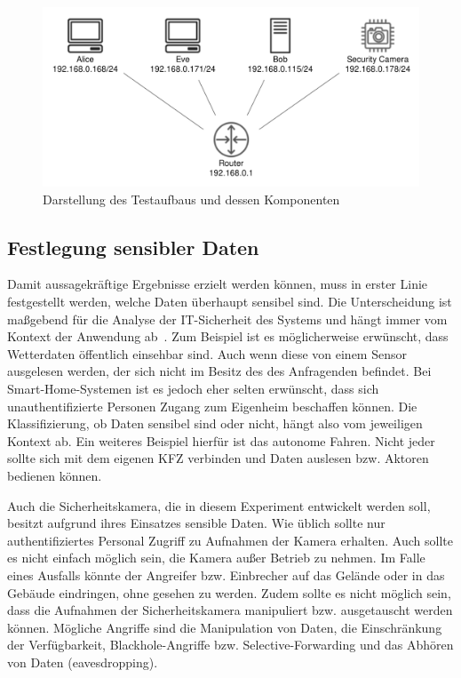 \begin{figure}[htbp]
  \centerline{\includegraphics[width=\columnwidth]{images/testing-setup}}
  \caption{Darstellung des Testaufbaus und dessen Komponenten}
  \label{fig:testing-setup}
\end{figure}

\subsection{Festlegung sensibler Daten}
Damit aussagekräftige Ergebnisse erzielt werden können, muss in erster Linie
festgestellt werden, welche Daten überhaupt sensibel sind. Die Unterscheidung
ist maßgebend für die Analyse der IT-Sicherheit des Systems und hängt immer vom
Kontext der Anwendung ab~\cite{paper}. Zum Beispiel ist es möglicherweise
erwünscht, dass Wetterdaten öffentlich einsehbar sind. Auch wenn diese
von einem Sensor ausgelesen werden, der sich nicht im Besitz des des Anfragenden
befindet. Bei Smart-Home-Systemen ist es jedoch eher selten erwünscht, dass sich
unauthentifizierte Personen Zugang zum Eigenheim beschaffen können. Die
Klassifizierung, ob Daten sensibel sind oder nicht, hängt also vom jeweiligen
Kontext ab. Ein weiteres Beispiel hierfür ist das autonome Fahren. Nicht jeder
sollte sich mit dem eigenen KFZ verbinden und Daten auslesen bzw. Aktoren
bedienen können.

Auch die Sicherheitskamera, die in diesem Experiment entwickelt werden soll,
besitzt aufgrund ihres Einsatzes sensible Daten. Wie üblich sollte nur
authentifiziertes Personal Zugriff zu Aufnahmen der Kamera erhalten. Auch sollte
es nicht einfach möglich sein, die Kamera außer Betrieb zu nehmen. Im Falle
eines Ausfalls könnte der Angreifer bzw. Einbrecher auf das Gelände oder in das
Gebäude eindringen, ohne gesehen zu werden. Zudem sollte es nicht möglich sein,
dass die Aufnahmen der Sicherheitskamera manipuliert bzw. ausgetauscht werden
können. Mögliche Angriffe sind die Manipulation von Daten, die Einschränkung
der Verfügbarkeit, Blackhole-Angriffe bzw. Selective-Forwarding und das Abhören
von Daten (eavesdropping).
